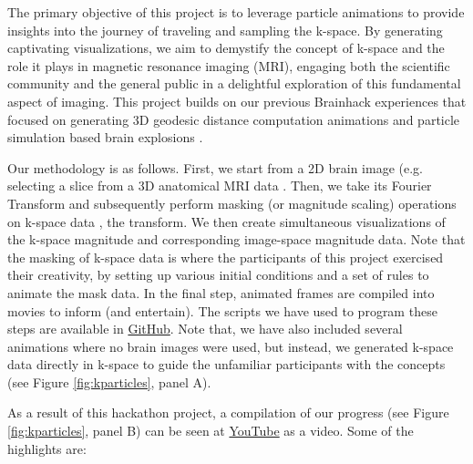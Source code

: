 \documentclass{article}
\begin{document}
The primary objective of this project is to leverage particle animations to provide insights into the journey of traveling and sampling the k-space. By generating captivating visualizations, we aim to demystify the concept of k-space and the role it plays in magnetic resonance imaging (MRI), engaging both the scientific community and the general public in a delightful exploration of this fundamental aspect of imaging. This project builds on our previous Brainhack experiences that focused on generating 3D geodesic distance computation animations \cite{Brainhack2021} and particle simulation based brain explosions \cite{Moia2024}.

Our methodology is as follows. First, we start from a 2D brain image (e.g. selecting a slice from a 3D anatomical MRI data
\cite{Brett2023-ia,Numpy,Scipy}. Then, we take its Fourier Transform and subsequently perform masking (or magnitude scaling) operations on k-space data \cite{Bernstein2004}, the transform. We then create simultaneous visualizations of the k-space magnitude and corresponding image-space magnitude data. Note that the masking of k-space data is where the participants of this project exercised their creativity, by setting up various initial conditions and a set of rules to animate the mask data. In the final step, animated frames are compiled into movies to inform (and entertain). The scripts we have used to program these steps are available in \href{https://github.com/ofgulban/k_particles}{GitHub}. Note that, we have also included several animations where no brain images were used, but instead, we generated k-space data directly in k-space to guide the unfamiliar participants with the concepts (see Figure \ref{fig:kparticles}, panel A).

As a result of this hackathon project, a compilation of our progress (see Figure \ref{fig:kparticles}, panel B) can be seen at \href{https://youtu.be/_5ZDctWv5X4}{YouTube} as a video. Some of the highlights are:
\end{document}

